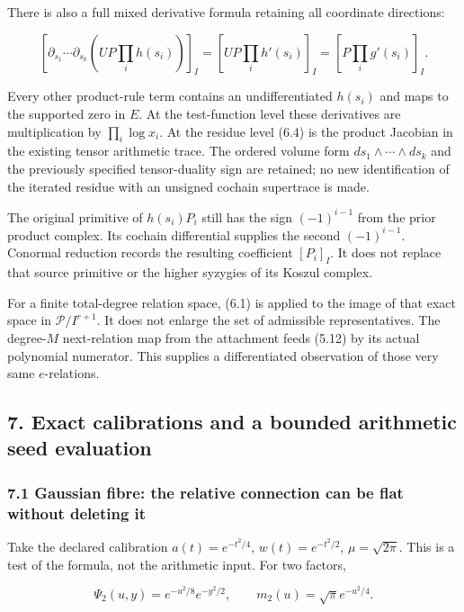 \documentclass[
]{article}
\begin{document}
There is also a full mixed derivative formula retaining all coordinate
directions:

\[\boxed{\left[\partial_{s_1}\cdots\partial_{s_k}
\left(UP\prod_i h(s_i)\right)\right]_I
=\left[U P\prod_i h'(s_i)\right]_I
=\left[P\prod_i g'(s_i)\right]_I.}\tag{6.4}\]

Every other product-rule term contains an undifferentiated \(h(s_i)\)
and maps to the supported zero in \(E\). At the test-function level
these derivatives are multiplication by \(\prod_i\log x_i\). At the
residue level (6.4) is the product Jacobian in the existing tensor
arithmetic trace. The ordered volume form
\(ds_1\wedge\cdots\wedge ds_k\) and the previously specified
tensor-duality sign are retained; no new identification of the iterated
residue with an unsigned cochain supertrace is made.

The original primitive of \(h(s_i)P_i\) still has the sign
\((-1)^{i-1}\) from the prior product complex. Its cochain differential
supplies the second \((-1)^{i-1}\). Conormal reduction records the
resulting coefficient \([P_i]_I\). It does not replace that source
primitive or the higher syzygies of its Koszul complex.

For a finite total-degree relation space, (6.1) is applied to the image
of that exact space in \(\mathcal P/I^{r+1}\). It does not enlarge the
set of admissible representatives. The degree-\(M\) next-relation map
from the attachment feeds (5.12) by its actual polynomial numerator.
This supplies a differentiated observation of those very same
\(e\)-relations.

\subsection{7. Exact calibrations and a bounded arithmetic seed
evaluation}\label{exact-calibrations-and-a-bounded-arithmetic-seed-evaluation}

\subsubsection{7.1 Gaussian fibre: the relative connection can be flat
without deleting
it}\label{gaussian-fibre-the-relative-connection-can-be-flat-without-deleting-it}

Take the declared calibration \(a(t)=e^{-t^2/4}\), \(w(t)=e^{-t^2/2}\),
\(\mu=\sqrt{2\pi}\). This is a test of the formula, not the arithmetic
input. For two factors,

\[\Psi_2(u,y)=e^{-u^2/8}e^{-y^2/2},\qquad m_2(u)=\sqrt\pi e^{-u^2/4}.\]
\end{document}
